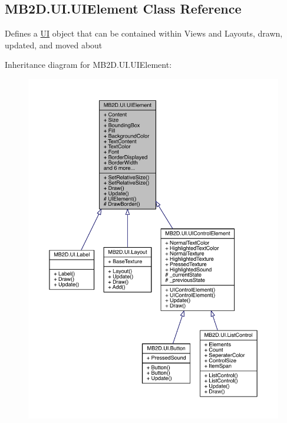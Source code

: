 \hypertarget{class_m_b2_d_1_1_u_i_1_1_u_i_element}{}\subsection{M\+B2\+D.\+U\+I.\+U\+I\+Element Class Reference}
\label{class_m_b2_d_1_1_u_i_1_1_u_i_element}


Defines a \hyperlink{namespace_m_b2_d_1_1_u_i}{UI} object that can be contained within Views and Layouts, drawn, updated, and moved about  




Inheritance diagram for M\+B2\+D.\+U\+I.\+U\+I\+Element\+:
\nopagebreak
\begin{figure}[H]
\begin{center}
\leavevmode
\includegraphics[width=350pt]{class_m_b2_d_1_1_u_i_1_1_u_i_element__inherit__graph}
\end{center}
\end{figure}


